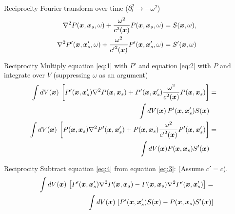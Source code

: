 \documentclass[xcolor=dvipsnames,notes]{beamer}
\begin{document}
\begin{frame}{Reciprocity}
Fourier transform over time ($\partial^2_t \rightarrow -\omega^2$)
\begin{eqnarray}
\nabla^2 P(\mbox{\boldmath $x$},\mbox{\boldmath $x$}_s,\omega) + \frac{\omega^2}{c^2(\mbox{\boldmath $x$})} P(\mbox{\boldmath $x$},\mbox{\boldmath $x$}_s,\omega) = S(\mbox{\boldmath $x$},\omega)\label{eq:1}  ,\\ 
\nabla^2 P'(\mbox{\boldmath $x$},\mbox{\boldmath $x$}'_s,\omega) + \frac{\omega^2}{{c'}^2(\mbox{\boldmath $x$})} P'(\mbox{\boldmath $x$},\mbox{\boldmath $x$}'_s,\omega) = S'(\mbox{\boldmath $x$},\omega) \label{eq:2}
\end{eqnarray}
\end{frame}
\begin{frame}{Reciprocity}
Multiply equation \eqref{eq:1} with $P'$ and equation \eqref{eq:2} with $P$ and integrate over $V$ (suppressing $\omega$ as an argument)
\begin{eqnarray}
\int dV(\mbox{\boldmath $x$})\, \left[P'(\mbox{\boldmath $x$},\mbox{\boldmath $x$}'_s)\nabla^2 P(\mbox{\boldmath $x$},\mbox{\boldmath $x$}_s) + P'(\mbox{\boldmath $x$},\mbox{\boldmath $x$}'_s)\frac{\omega^2}{c^2(\mbox{\boldmath $x$})} P(\mbox{\boldmath $x$},\mbox{\boldmath $x$}_s)\right]  & = & \nonumber \\ 
                                                                                                              \int dV(\mbox{\boldmath $x$})\, P'(\mbox{\boldmath $x$},\mbox{\boldmath $x$}'_s)S(\mbox{\boldmath $x$})\label{eq:3}&&  \\ 
\int dV(\mbox{\boldmath $x$})\, \left[P(\mbox{\boldmath $x$},\mbox{\boldmath $x$}_s)\nabla^2 P'(\mbox{\boldmath $x$},\mbox{\boldmath $x$}'_s) + P(\mbox{\boldmath $x$},\mbox{\boldmath $x$}_s)\frac{\omega^2}{{c'}^2(\mbox{\boldmath $x$})} P'(\mbox{\boldmath $x$},\mbox{\boldmath $x$}'_s)\right]  & = &\nonumber\\ 
                                                                                                               \int dV(\mbox{\boldmath $x$}) P(\mbox{\boldmath $x$},\mbox{\boldmath $x$}_s)S'(\mbox{\boldmath $x$})&& \label{eq:4} 
\end{eqnarray}
\end{frame}
\begin{frame}{Reciprocity}
Subtract equation \eqref{eq:4} from equation \eqref{eq:3}:
(Assume $c'=c$).
\begin{eqnarray}
\int dV(\xx)\, \left[P'(\xx,\xx'_s)\nabla^2 P(\xx,\xx_s)-P(\xx,\xx_s)\nabla^2 P'(\xx,\xx'_s)\right] = \nonumber\\
       \int dV(\xx)\, \left[P'(\xx,\xx'_s)S(\xx) -P(\xx,\xx_s)S'(\xx)\right]
                   \label{eq:100}
\end{eqnarray}
\end{frame}
\end{document}
